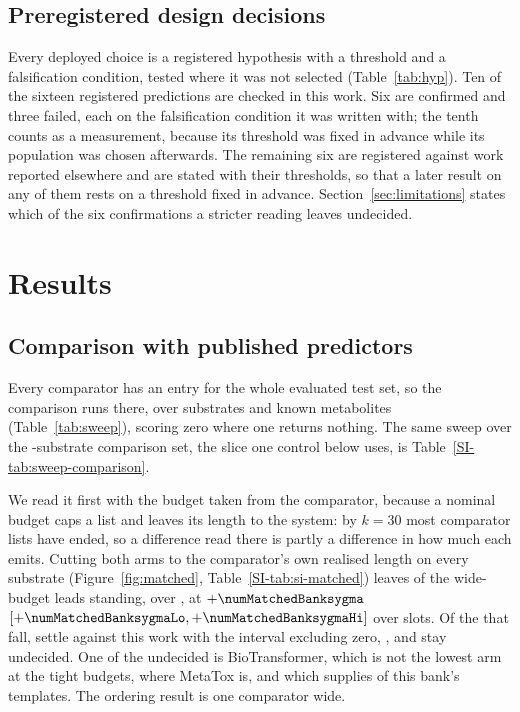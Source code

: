 \subsection{Preregistered design decisions}
\label{sec:register}

Every deployed choice is a registered hypothesis with a threshold and a falsification condition,
tested where it was not selected (Table~\ref{tab:hyp}). Ten of the sixteen registered predictions are checked in this work.
Six are confirmed and three failed, each on the falsification condition it was written with; the tenth counts as
a measurement, because its threshold was fixed in advance while its population was chosen
afterwards. The remaining six are registered against work reported elsewhere and are stated with their thresholds, so that a later result on any of them rests on a threshold fixed in advance. Section~\ref{sec:limitations} states which of the six confirmations a stricter
reading leaves undecided.



\section{Results}
\label{sec:results}

\subsection{Comparison with published predictors}



Every comparator has an entry for the whole evaluated test set, so the comparison runs there, over
\numWholeN{} substrates and \numWholeReferences{} known metabolites (Table~\ref{tab:sweep}),
scoring zero where one returns nothing. The same sweep over the \numPopulationN{}-substrate
comparison set, the slice one control below uses, is Table~\ref{SI-tab:sweep-comparison}.

We read it first with the budget taken from the comparator, because a nominal budget caps a list
and leaves its length to the system: by $k=30$ most comparator lists have ended, so a difference
read there is partly a difference in how much each emits. Cutting both arms to the comparator's
own realised length on every substrate (Figure~\ref{fig:matched}, Table~\ref{SI-tab:si-matched})
leaves \numMatchedSurviveWord{} of the
\numMatchedComparatorsWord{} wide-budget leads standing, over \numMatchedSurvivenames{}, at
$+\numMatchedBanksygma$ $[+\numMatchedBanksygmaLo, +\numMatchedBanksygmaHi]$ over
\numMatchedBanksygmaSlots{} slots. Of the \numMatchedOthersWord{} that fall,
\numMatchedOthersagainstWord{} settle against this work with the interval excluding zero,
\numMatchedOthersagainstnames{}, and \numMatchedOthersundecidedWord{} stay undecided. One of the undecided
is BioTransformer, which is not the lowest arm at the tight budgets, where MetaTox is, and which
supplies \numThirdpartyBiotransformerShipped{} of this bank's templates. The ordering result is
one comparator wide.

